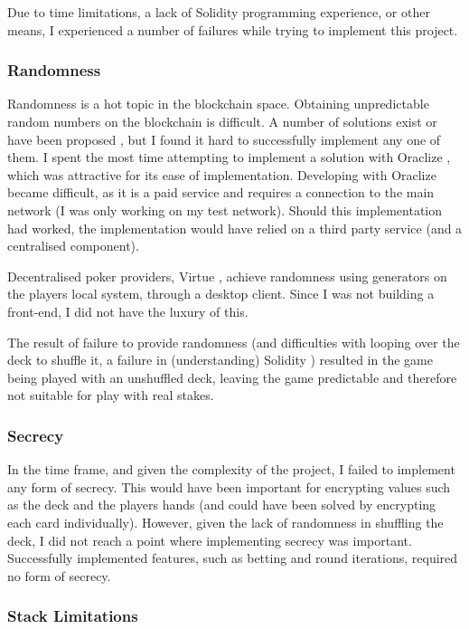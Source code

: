 Due to time limitations, a lack of Solidity programming experience, or other means, I experienced a number of failures while trying to implement this project.

\subsubsection{Randomness}

Randomness is a hot topic in the blockchain space. Obtaining unpredictable random numbers on the blockchain is difficult. A number of solutions exist or have been proposed \cite{random}, but I found it hard to successfully implement any one of them. I spent the most time attempting to implement a solution with Oraclize \cite{oraclize}, which was attractive for its ease of implementation. Developing with Oraclize became difficult, as it is a paid service and requires a connection to the main network (I was only working on my test network). Should this implementation had worked, the implementation would have relied on a third party service (and a centralised component).

Decentralised poker providers, Virtue \cite{virtue}, achieve randomness using generators on the players local system, through a desktop client. Since I was not building a front-end, I did not have the luxury of this.

The result of failure to provide randomness (and difficulties with looping over the deck to shuffle it, a failure in (understanding) Solidity \cite{shuffling}) resulted in the game being played with an unshuffled deck, leaving the game predictable and therefore not suitable for play with real stakes.

\subsubsection{Secrecy}

In the time frame, and given the complexity of the project, I failed to implement any form of secrecy. This would have been important for encrypting values such as the deck and the players hands (and could have been solved by encrypting each card individually). However, given the lack of randomness in shuffling the deck, I did not reach a point where implementing secrecy was important. Successfully implemented features, such as betting and round iterations, required no form of secrecy.

\subsubsection{Stack Limitations}

